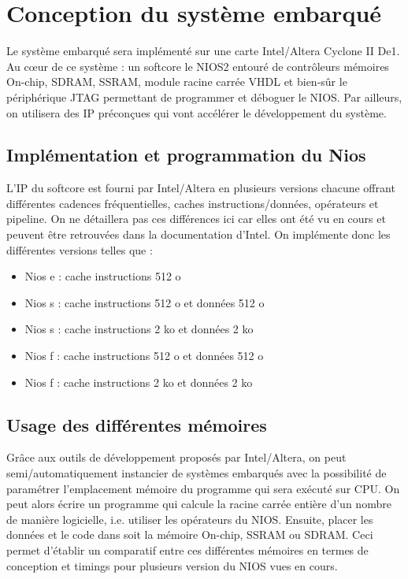 \documentclass[12pt,a4paper]{article}
\begin{document}
\section{Conception du système embarqué} %
Le système embarqué sera implémenté sur une carte Intel/Altera Cyclone II De1. Au cœur de ce système : un softcore le NIOS2 entouré de contrôleurs mémoires On-chip, SDRAM, SSRAM, module racine carrée VHDL et bien-sûr le périphérique JTAG permettant de programmer et déboguer le NIOS. Par ailleurs, on utilisera des IP préconçues qui vont accélérer le développement du système. 


\subsection{Implémentation et programmation du Nios}
L'IP du softcore est fourni par Intel/Altera en plusieurs versions chacune offrant différentes cadences fréquentielles, caches instructions/données, opérateurs et pipeline. On ne détaillera pas ces différences ici car elles ont été vu en cours et peuvent être retrouvées dans la documentation d'Intel. On implémente donc les différentes versions telles que :
\begin{itemize}
\item Nios e : cache instructions 512 o
\item Nios s : cache instructions 512 o et données 512 o
\item Nios s : cache instructions 2 ko et données 2 ko
\item Nios f : cache instructions 512 o et données 512 o
\item Nios f : cache instructions 2 ko et données 2 ko
\end{itemize}
\subsection{Usage des différentes mémoires}
Grâce aux outils de développement proposés par Intel/Altera, on peut semi/automatiquement instancier de systèmes embarqués avec la possibilité de paramétrer l'emplacement mémoire du programme qui sera exécuté sur CPU. On peut alors écrire un programme qui calcule la racine carrée entière d'un nombre de manière logicielle, i.e. utiliser les opérateurs du NIOS. Ensuite, placer les données et le code dans soit la mémoire On-chip, SSRAM ou SDRAM. Ceci permet d'établir un comparatif entre ces différentes mémoires en termes de conception et timings pour plusieurs version du NIOS vues en cours. 
\end{document}
